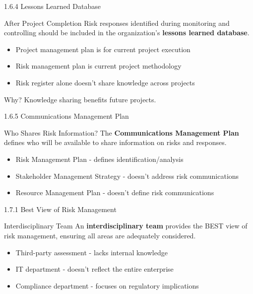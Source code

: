 \documentclass{beamer}
\begin{document}
	\begin{frame}{1.6.4 Lessons Learned Database}
		\begin{block}{After Project Completion}
			Risk responses identified during monitoring and controlling should be included in the organization's \textbf{lessons learned database}.
		\end{block}
		\begin{itemize}
			\item Project management plan is for current project execution
			\item Risk management plan is current project methodology
			\item Risk register alone doesn't share knowledge across projects
		\end{itemize}
		\begin{exampleblock}{Why?}
			Knowledge sharing benefits future projects.
		\end{exampleblock}
	\end{frame}
	
	\begin{frame}{1.6.5 Communications Management Plan}
		\begin{block}{Who Shares Risk Information?}
			The \textbf{Communications Management Plan} defines who will be available to share information on risks and responses.
		\end{block}
		\begin{itemize}
			\item Risk Management Plan - defines identification/analysis
			\item Stakeholder Management Strategy - doesn't address risk communications
			\item Resource Management Plan - doesn't define risk communications
		\end{itemize}
	\end{frame}
	
	\begin{frame}{1.7.1 Best View of Risk Management}
		\begin{block}{Interdisciplinary Team}
			An \textbf{interdisciplinary team} provides the BEST view of risk management, ensuring all areas are adequately considered.
		\end{block}
		\begin{itemize}
			\item Third-party assessment - lacks internal knowledge
			\item IT department - doesn't reflect the entire enterprise
			\item Compliance department - focuses on regulatory implications
		\end{itemize}
	\end{frame}
	
\end{document}
